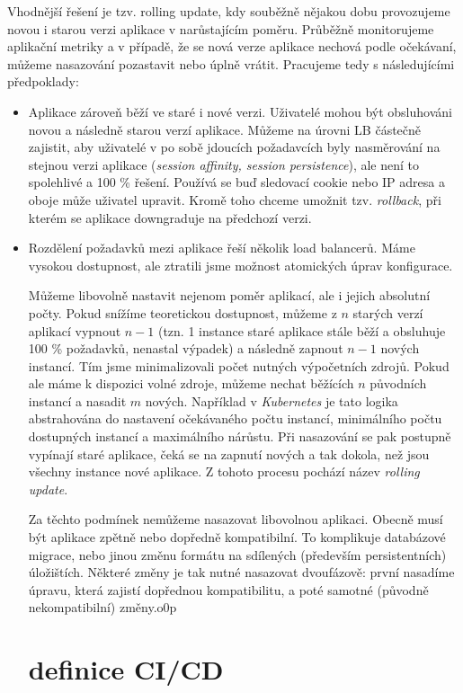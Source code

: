             Vhodnější řešení je tzv. rolling update, kdy souběžně nějakou dobu provozujeme novou i starou verzi aplikace v narůstajícím poměru. Průběžně monitorujeme aplikační metriky a v případě, že se nová verze aplikace nechová podle očekávaní, můžeme nasazování pozastavit nebo úplně vrátit. Pracujeme tedy s následujícími předpoklady:
            \begin{itemize}
                \item Aplikace zároveň běží ve staré i nové verzi. Uživatelé mohou být obsluhováni novou a následně starou verzí aplikace.  Můžeme na úrovni LB částečně zajistit, aby uživatelé v po sobě jdoucích požadavcích byly nasměrování na stejnou verzi aplikace (\textit{session affinity, session persistence}), ale není to spolehlivé a 100 \% řešení. Používá se buď sledovací cookie nebo IP adresa a oboje může uživatel upravit. Kromě toho chceme umožnit tzv. \textit{rollback}, při kterém se aplikace downgraduje na předchozí verzi.
                \item Rozdělení požadavků mezi aplikace řeší několik load balancerů. Máme vysokou dostupnost, ale ztratili jsme možnost atomických úprav konfigurace.

            Můžeme libovolně nastavit nejenom poměr aplikací, ale i jejich absolutní počty. Pokud snížíme teoretickou dostupnost, můžeme z $n$ starých verzí aplikací vypnout $n-1$ (tzn. 1 instance staré aplikace stále běží a obsluhuje 100 \% požadavků, nenastal výpadek) a následně zapnout $n-1$ nových instancí. Tím jsme minimalizovali počet nutných výpočetních zdrojů. Pokud ale máme k dispozici volné zdroje, můžeme nechat běžících $n$ původních instancí a nasadit $m$ nových. Například v \textit{Kubernetes} je tato logika abstrahována do nastavení očekávaného počtu instancí, minimálního počtu dostupných instancí a maximálního nárůstu. Při nasazování se pak postupně vypínají staré aplikace, čeká se na zapnutí nových a tak dokola, než jsou všechny instance nové aplikace. Z tohoto procesu pochází název \textit{rolling update}.

            Za těchto podmínek nemůžeme nasazovat libovolnou aplikaci. Obecně musí být aplikace zpětně nebo dopředně kompatibilní. To komplikuje databázové migrace, nebo jinou změnu formátu na sdílených (především persistentních) úložištích. Některé změny je tak nutné nasazovat dvoufázově: první nasadíme úpravu, která zajistí dopřednou kompatibilitu, a poté samotné (původně nekompatibilní) změny.o0p


    \section{definice CI/CD}

\end{itemize}
